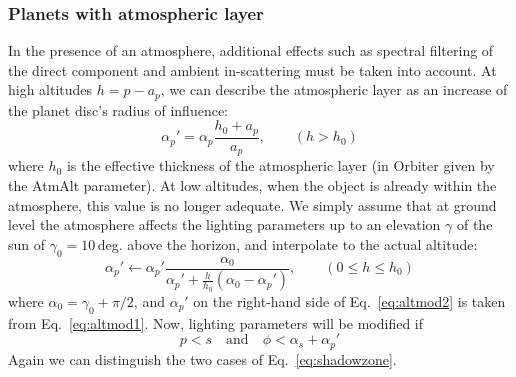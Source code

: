 \documentclass[Orbiter Technical Reference.tex]{subfiles}
\begin{document}
\subsubsection{Planets with atmospheric layer}
In the presence of an atmosphere, additional effects such as spectral filtering of the direct component and ambient in-scattering must be taken into account.
At high altitudes $h=p-a_p$, we can describe the atmospheric layer as an increase of the planet disc's radius of influence:
\begin{equation}\label{eq:altmod1}
\alpha_p' = \alpha_p \frac{h_0 + a_p}{a_p},\qquad (h > h_0)
\end{equation}
where $h_0$ is the effective thickness of the atmospheric layer (in Orbiter given by the AtmAlt parameter).
At low altitudes, when the object is already within the atmosphere, this value is no longer adequate. We simply assume that at ground level the atmosphere affects the lighting parameters up to an elevation $\gamma$ of the sun of $\gamma_0=10$\,deg. above the horizon, and interpolate to the actual altitude:
\begin{equation}\label{eq:altmod2}
\alpha_p' \leftarrow \alpha_p' \frac{\alpha_0}{\alpha_p'+\frac{h}{h_0}(\alpha_0-\alpha_p')},\qquad (0 \leq h \leq h_0)
\end{equation}
where $\alpha_0 = \gamma_0+\pi/2$, and $\alpha_p'$ on the right-hand side of Eq.~\ref{eq:altmod2} is taken from Eq.~\ref{eq:altmod1}.
Now, lighting parameters will be modified if
\begin{equation}
p < s \quad\text{and}\quad \phi < \alpha_s + \alpha_p'
\end{equation}
Again we can distinguish the two cases of Eq.~\ref{eq:shadowzone}.
\end{document}

